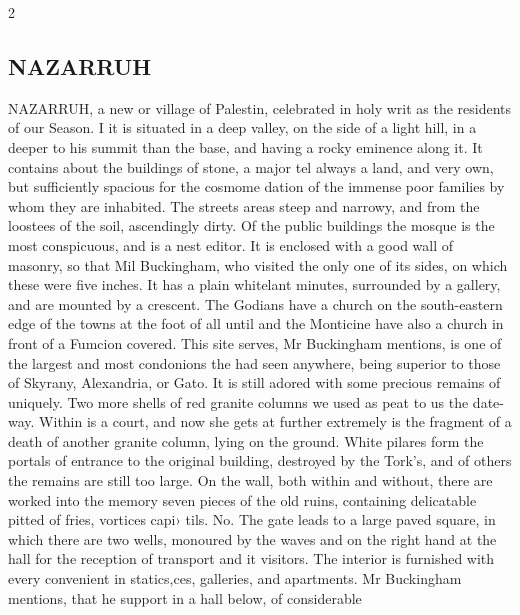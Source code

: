 \documentclass[10pt]{article}
\begin{document}
\begin{multicols}{2}
\subsection*{NAZARRUH}
NAZARRUH, a new or village of Palestin, celebrated in holy writ as the residents of our Season. I it is situated in a deep valley, on the side of a light hill, in a deeper to his summit than the base, and having a rocky eminence along it. It contains about the buildings of stone, a major tel always a land, and very own, but sufficiently spacious for the cosmome dation of the immense poor families by whom they are inhabited. The streets areas steep and narrowy, and from the loostees of the soil, ascendingly dirty. Of the public buildings the mosque is the most conspicuous, and is a nest editor. It is enclosed with a good wall of masonry, so that Mil Buckingham, who visited the only one of its sides, on which these were five inches. It has a plain whitelant minutes, surrounded by a gallery, and are mounted by a crescent. The Godians have a church on the south-eastern edge of the towns at the foot of all until and the Monticine have also a church in front of a Fumcion covered. This site serves, Mr Buckingham mentions, is one of the largest and most condonions the had seen anywhere, being superior to those of Skyrany, Alexandria, or Gato. It is still adored with some precious remains of uniquely. Two more shells of red granite columns we used as peat to us the date-way. Within is a court, and now she gets at further extremely is the fragment of a death of another granite column, lying on the ground. White pilares form the portals of entrance to the original building, destroyed by the Tork's, and of others the remains are still too large. On the wall, both within and without, there are worked into the memory seven pieces of the old ruins, containing delicatable pitted of fries, vortices capi› tils. No. The gate leads to a large paved square, in which there are two wells, monoured by the waves and on the right hand at the hall for the reception of transport and it visitors. The interior is furnished with every convenient in statics,ces, galleries, and apartments. Mr Buckingham mentions, that he support in a hall below, of considerable


\end{multicols}
\end{document}

